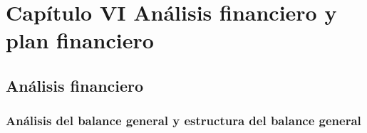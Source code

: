 \documentclass[
  stu,
  floatsintext,
  longtable,
  a4paper,
  nolmodern,
  notxfonts,
  notimes,
  colorlinks=true,linkcolor=blue,citecolor=blue,urlcolor=blue]{apa7}
\begin{document}
\section{Capítulo VI Análisis financiero y plan
financiero}\label{capuxedtulo-vi-anuxe1lisis-financiero-y-plan-financiero}

\subsection{Análisis financiero}\label{anuxe1lisis-financiero}

\subsubsection{Análisis del balance general y estructura del balance
general}\label{anuxe1lisis-del-balance-general-y-estructura-del-balance-general}
\end{document}

